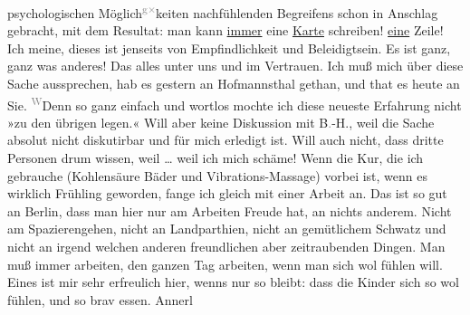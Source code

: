 \begin{ledgroupsized}[t]{13cm}
               psychologischen Möglich\substVorne{}\textsuperscript{\textcolor{gray}{g}\textcolor{gray}{×}}\substDazwischen{}k\substHinten{}eiten nachfühlenden Begreifens schon in Anschlag gebracht, mit dem Resultat:
               man kann \uline{immer} eine \uline{Karte} schreiben! \uline{eine} Zeile! Ich meine,
               dieses ist jenseits von Empfindlichkeit und Beleidigtsein. Es ist ganz, ganz was
               anderes! Das alles unter uns und im Vertrauen. Ich muß mich über diese Sache
               aussprechen, hab es gestern an Hofmannsthal gethan, und that es heute an Sie. \substVorne{}\textsuperscript{\textcolor{gray}{W}}\substDazwischen{}De\substHinten{}nn so ganz einfach und wortlos mochte ich diese neueste Erfahrung nicht »zu
               den übrigen legen.« Will aber keine Diskussion mit B\textcolor{gray}{.}-H., weil die Sache absolut nicht diskutirbar und
               für mich erledigt ist. Will auch nicht, dass dritte Personen drum wissen, weil {\dots} weil ich mich schäme!\pend
           \pstart
           Wenn die Kur, die ich gebrauche (Kohlensäure Bäder und Vibrations-Massage) vorbei
               ist, wenn es wirklich Frühling geworden, fange ich gleich mit einer Arbeit an. Das
               ist so gut an Berlin, dass man hier nur am
               Arbeiten Freude hat, an nichts anderem. Nicht am Spazierengehen, nicht an
               Landparthien, nicht an gemütlichem Schwatz und nicht an irgend welchen anderen
               freundlichen aber zeitraubenden Dingen. Man muß immer arbeiten, den ganzen Tag
               arbeiten, wenn man sich wol fühlen will.\pend
           \pstart
           {\pb}Eines ist mir sehr erfreulich
                  hier, wenns nur so bleibt:
               dass die Kinder
               sich so wol fühlen, und so brav essen. Annerl

\end{ledgroupsized}
